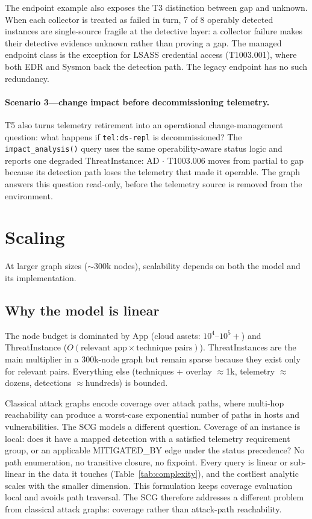 \documentclass[10pt]{article}
\newcommand{\code}[1]{\texttt{#1}}
\begin{document}
The endpoint example also exposes the T3 distinction between gap and unknown. When each collector is treated as failed in turn, 7 of 8 operably detected instances are single-source fragile at the detective layer: a collector failure makes their detective evidence unknown rather than proving a gap. The managed endpoint class is the exception for LSASS credential access (T1003.001), where both EDR and Sysmon back the detection path. The legacy endpoint has no such redundancy.

\paragraph{Scenario 3---change impact before decommissioning telemetry.} T5 also turns telemetry retirement into an operational change-management question: what happens if \code{tel:ds-repl} is decommissioned? The \code{impact\_analysis()} query uses the same operability-aware status logic and reports one degraded ThreatInstance: AD $\cdot$ T1003.006 moves from partial to gap because its detection path loses the telemetry that made it operable. The graph answers this question read-only, before the telemetry source is removed from the environment.

\section{Scaling}
At larger graph sizes ($\sim$300k nodes), scalability depends on both the model and its implementation.

\subsection{Why the model is linear}
The node budget is dominated by App (cloud assets: $10^4$--$10^5+$) and ThreatInstance ($O(\text{relevant app}\times\text{technique pairs})$). ThreatInstances are the main multiplier in a 300k-node graph but remain sparse because they exist only for relevant pairs. Everything else (techniques + overlay $\approx$1k, telemetry $\approx$dozens, detections $\approx$hundreds) is bounded.

Classical attack graphs encode coverage over attack paths, where multi-hop reachability can produce a worst-case exponential number of paths in hosts and vulnerabilities. The SCG models a different question. Coverage of an instance is local: does it have a mapped detection with a satisfied telemetry requirement group, or an applicable MITIGATED\_BY edge under the status precedence? No path enumeration, no transitive closure, no fixpoint. Every query is linear or sub-linear in the data it touches (Table~\ref{tab:complexity}), and the costliest analytic scales with the smaller dimension. This formulation keeps coverage evaluation local and avoids path traversal. The SCG therefore addresses a different problem from classical attack graphs: coverage rather than attack-path reachability.
\end{document}
